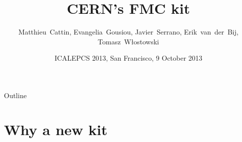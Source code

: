 \documentclass[compress,red]{beamer}
\title[CERN's FMC kit] %
{CERN's FMC kit}
\author[Matthieu Cattin] %
{\mbox{Matthieu Cattin}, \mbox{Evangelia Gousiou}, \mbox{Javier Serrano}, \mbox{Erik van der Bij}, \mbox{Tomasz W\l{}ostowski}}
\institute%
{
  CERN, Geneva, Switzerland
 }
\date[ICALEPCS 2013] %
{ICALEPCS 2013, San Francisco, 9 October 2013}
\begin{document}
\begin{frame}
  \titlepage
\end{frame}

\begin{frame}{Outline}
  \tableofcontents
\end{frame}







\section{Why a new kit}

\subsection*{} %
\end{document}
